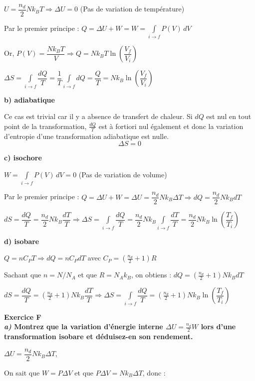 \documentclass	[11pt, a4paper, openany]{book}
\newcommand{\exerc}[2]{\textbf{\Large Exercice #1\normalsize \\#2}}
\begin{document}
		$ U = \dfrac{n_d}{2}Nk_BT \Rightarrow \Delta U = 0$ (Pas de variation de température)
		
		Par le premier principe : $ Q = \Delta U + W = W = \int  \limits_{i \to f} P(V)\,dV$
		
		Or, $ P(V) = \dfrac{Nk_BT}{V} \Rightarrow Q = Nk_BT\ln \left(\dfrac{V_f}{V_i}\right)$
		
		$ \Delta S = \int \limits_{i \to f} \dfrac{dQ}{T} = \dfrac{1}{T} \int \limits_{i \to f} dQ = \dfrac{Q}{T} = Nk_B\ln \left(\dfrac{V_f}{V_i}\right)$
	
	\textbf{b) adiabatique}
		
		Ce cas est trivial car il y a absence de transfert de chaleur. Si $dQ$ est nul en tout point de la transformation, $\frac{dQ}{T}$ est à fortiori nul également et donc la variation d'entropie d'une transformation adiabatique est nulle. $$\Delta S = 0$$
		
	\textbf{c) isochore}
	
		$W = \int  \limits_{i \to f} P(V)\,dV = 0$ (Pas de variation de volume)
		
		Par le premier principe : $ Q = \Delta U + W = \Delta U = \dfrac{n_d}{2}Nk_B\Delta T \Rightarrow dQ = \dfrac{n_d}{2}Nk_BdT $
		
		$ dS = \dfrac{dQ}{T} = \dfrac{n_d}{2}Nk_B\dfrac{dT}{T} \Rightarrow \Delta S = \int \limits_{i \to f} \dfrac{dQ}{T} = \dfrac{n_d}{2}Nk_B \int \limits_{i \to f} \dfrac{dT}{T} = \dfrac{n_d}{2}Nk_B\ln \left(\dfrac{T_f}{T_i}\right)$
		
	\textbf{d) isobare}
		
		$ Q = nC_PT \Rightarrow dQ = nC_PdT$ avec $ C_P = (\frac{n_d}{2}+1)R$
		
		Sachant que $n = N/N_A$ et que $R = N_Ak_B$, on obtiens : $dQ = (\frac{n_d}{2}+1)Nk_BdT $
		
		$dS = \dfrac{dQ}{T} = (\frac{n_d}{2}+1)Nk_B\dfrac{dT}{T} \Rightarrow \Delta S = \int \limits_{i \to f} \dfrac{dQ}{T} = (\frac{n_d}{2}+1)Nk_B\ln \left(\dfrac{T_f}{T_i}\right)$

\vspace{0,5cm}

\exerc{F}{\textit{a)} Montrez que la variation d'énergie interne $\Delta U = \frac{n_d}{2}W$ lors d'une transformation isobare et déduisez-en son rendement.}
		
		$\Delta U = \dfrac{n_d}{2}Nk_B\Delta T $,
		
		On sait que $W = P\Delta V$ et que $ P\Delta V = Nk_B\Delta T$, donc :
		
\end{document}
